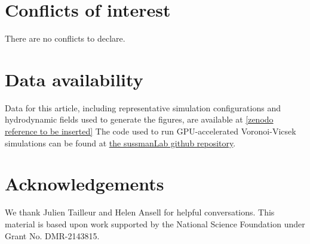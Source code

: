 \documentclass[twoside,twocolumn,9pt]{article}
\renewcommand{\refname}{Notes and references}
\begin{document}


\section*{Conflicts of interest}
There are no conflicts to declare.

\section*{Data availability}
Data for this article, including representative simulation configurations and hydrodynamic fields used to generate the figures, are available at \href{zenodo.org}{[zenodo reference to be inserted]} The code used to run GPU-accelerated Voronoi-Vicsek simulations can be found at \href{https://github.com/sussmanLab/topologicalFlocking}{the sussmanLab github repository}\cite{sussman_2024_13646481}.

\section*{Acknowledgements}
We thank Julien Tailleur and Helen Ansell for helpful conversations. 
This material is based upon work supported by the National Science Foundation under Grant No. DMR-2143815.



\end{document}
